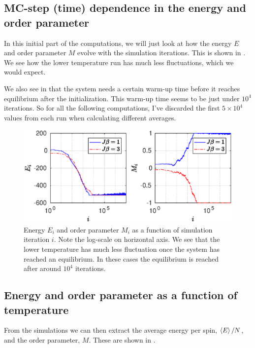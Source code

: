 \documentclass[11pt,letter, swedish, english
]{article}
\begin{document}
\subsection{MC-step (time) dependence in the energy 
and order parameter}
In this initial part of the computations, we will just look at how the
energy $E$ and order parameter $M$ evolve with the simulation
iterations. This is shown in . We see how the lower
temperature run has much less fluctuations, which we would expect.

We also see in  that the system needs a certain
warm-up time before it reaches equilibrium after the
initialization. This warm-up time seems to be just under $10^4$
iterations. So for all the following computations, I've discarded the
first $5\times10^4$ values from each run when calculating different
averages. 



\begin{figure}
\centering
\includegraphics[width=1\textwidth]{EM_all-time-steps.eps}
\caption{Energy $E_i$ and order parameter $M_i$ as a function of
  simulation iteration $i$. Note the log-scale on horizontal axis. We
  see that the lower temperature has much less fluctuation once the
  system has reached an equilibrium. In these cases the equilibrium is
  reached after around $10^4$ iterations.} 
\label{fig:EM_all}
\end{figure}


\subsection{Energy and order parameter as a function of temperature}
From the simulations we can then extract the average energy per spin,
$\ev{E}/N$, and the order parameter, $M$. These are shown in
. 
\end{document}
